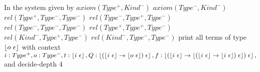 \documentclass{scrartcl}
\begin{document}
In the system given by $axiom (Type^+,Kind^-)$ $axiom (Type^-,Kind^-)$ $rel (Type^+,Type^-,Type^-)$ $rel (Type^-,Type^+,Type^-)$ $rel (Type^-,Type^-,Type^-)$ $rel (Type^+,Type^+,Type^-)$ $rel (Kind^-,Type^+,Type^-)$ $rel (Kind^-,Type^-,Type^-)$ print all terms of type $\left \lfloor o~\epsilon \right \rfloor$ with context ${i:Type^+,o:Type^-,t:\left \lfloor i~\epsilon \right \rfloor,Q:\left \lfloor (\left \lfloor i~\epsilon \right \rfloor \to \left \lfloor o~\epsilon \right \rfloor) \; \epsilon \right \rfloor,f:\left \lfloor (\left \lfloor i~\epsilon \right \rfloor \to \left \lfloor (\left \lfloor i~\epsilon \right \rfloor \to \left \lfloor i~\epsilon \right \rfloor) \; \epsilon \right \rfloor) \; \epsilon \right \rfloor,}$ and decide-depth 4
\end{document}
